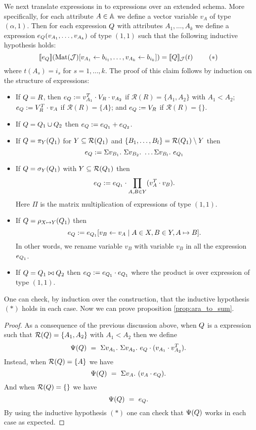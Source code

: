 We next translate \rak expressions in to \langsum expressions over an extended schema. More specifically, for each attribute $A \in \mathbb{A}$ we define a vector variable $v_A$ of type $(\alpha,1)$. Then for each \rak expression $Q$ with attributes $A_1, \ldots, A_k$ we define a \langsum expression $e_{Q}(v_{A_1}, \ldots, v_{A_k})$ of type $(1,1)$ such that the following inductive hypothesis holds:
$$
\llbracket e_{Q} \rrbracket(\text{Mat}(\mathcal{J})[v_{A_1} \gets b_{i_1},\ldots, v_{A_k} \gets b_{i_k}]) = 
\llbracket Q \rrbracket_{\mathcal{J}}(t) \ \ \ \ \ \ \  (*)
$$
where $t(A_s)=i_s$ for $s=1,\ldots, k$. The proof of this claim follows by induction on the structure of expressions:
\begin{itemize} \itemsep3mm
	\item If $Q=R$, then $e_{Q}:=v_{A_1}^T \cdot V_R \cdot v_{A_2}$ if $\mathcal{R}(R)=\{A_1,A_2\}$ with $A_1<A_2$; 
	$e_{Q}:=V_R^T \cdot v_A$ if $\mathcal{R}(R)=\{A\}$; and 
	$e_{Q}:=V_R$ if $\mathcal{R}(R)=\{\}$.
	\item If $Q=Q_1\cup Q_2$ then
	$e_{Q}:=e_{Q_1} + e_{Q_2}$.
	\item If $Q=\pi_{Y}(Q_1)$ for $Y\subseteq \mathcal{R}(Q_1)$ and $\{B_1, \ldots, B_l\} = \mathcal{R}(Q_1) \setminus Y$ then
	$$
	\earae:= \Sigma v_{B_1}. \ \Sigma v_{B_2}. \ \ldots \Sigma v_{B_l}. \ e_{\arae_1}
	$$
	\item If $Q=\sigma_{Y}(Q_1)$ with $Y\subseteq\mathcal{R}(Q_1)$ then
	$$
	e_{Q}:=e_{Q_1}\cdot \prod_{A,B\in Y} (v_{A}^T \cdot v_{B}).
	$$
	Here $\Pi$ is the matrix multiplication of expressions of type $(1,1)$.
	\item If $Q=\rho_{X\mapsto Y}(Q_1)$ then
	$$e_{Q}:=e_{Q_1}[v_B\gets v_A\mid A\in X, B\in Y, A\mapsto B].$$
	In other words, we rename variable $v_B$ with variable $v_B$ in all the expression $e_{Q_1}$. 
	\item If $Q=Q_1\bowtie Q_2$ then
	$e_{Q}:=e_{Q_1} \cdot e_{Q_1}$ where the product is over expression of type $(1,1)$.
\end{itemize}
One can check, by induction over the construction, that the inductive hypothesis $(*)$ holds in each case.
Now we can prove proposition \ref{prop:ara_to_sum}.

\begin{proof}
As a consequence of the previous discussion above, when $Q$ is a \rak expression 
such that $\mathcal{R}(Q)=\{A_1,A_2\}$ with $A_1<A_2$ then we define
$$
\Psi(Q) \ = \ \Sigma v_{A_1}. \ \Sigma v_{A_2}. \ e_{Q} \cdot (v_{A_1} \cdot v_{A_2}^T). 
$$
Instead, when $\mathcal{R}(Q)=\{A\}$ we have
$$
\Psi(Q) \ = \ \Sigma v_{A}. \  (v_{A} \cdot e_{Q}). 
$$
And when $\mathcal{R}(Q)=\{\}$ we have
$$
\Psi(Q) \ = \ e_{Q}.
$$
By using the inductive hypothesis $(*)$ one can check that $\Psi(Q)$ works in each case as expected. 
\end{proof}
 